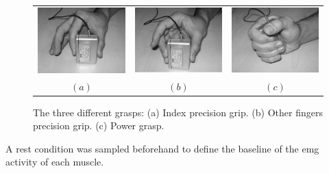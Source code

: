 \begin{figure}[!t] \centering
  \begin{tabular}{ccc}
   \includegraphics[height=0.16\textheight]{figs/grip1} &
    \includegraphics[height=0.16\textheight]{figs/grip2} &
    \includegraphics[height=0.16\textheight]{figs/grip3} \\
    $(a)$ & $(b)$ & $(c)$ \\
  \end{tabular}
  \caption{The three different grasps: (a) Index precision grip. (b) Other fingers precision grip. (c) Power grasp.}
  \label{fig:setup}
\end{figure}

A rest condition was sampled beforehand to define the baseline of the emg activity of each muscle.

